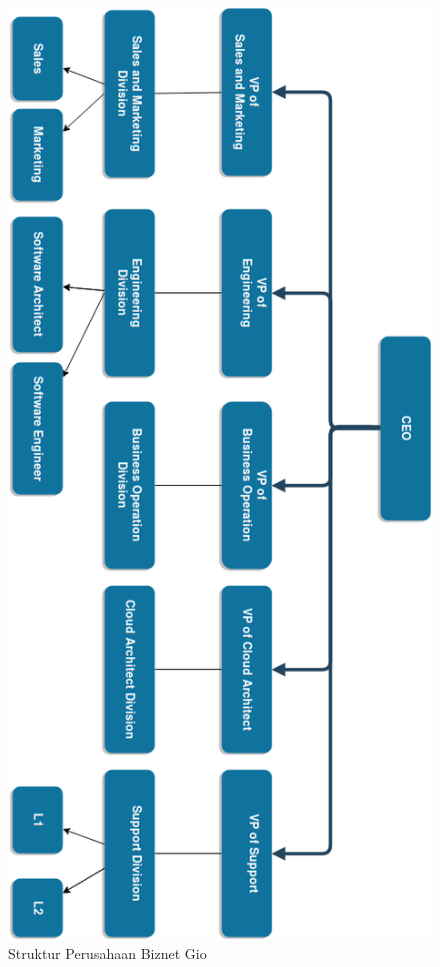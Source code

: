 \begin{figure}[H]
  \centering
  \includegraphics[width=.7\linewidth]{img/struktur-bgn-rotate.png}
  \caption{Struktur Perusahaan Biznet Gio \parencite{biznetgio}}
  \label{fig:struktur-bgn}
\end{figure}


